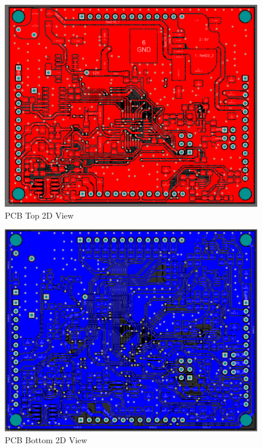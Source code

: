 		\begin{figure}[htbp]
			\centering
			\includegraphics[scale=0.7]{figuras/fig-pcb-design-top.png}
			\caption{PCB Top 2D View \cite{pcb-design-top}}
			\label{fig:pcb-design-top}
		\end{figure}

		\begin{figure}[htbp]
			\centering
			\includegraphics[scale=0.7]{figuras/fig-pcb-design-bottom.png}
			\caption{PCB Bottom 2D View \cite{pcb-design-bottom}}
			\label{fig:pcb-design-bottom}
		\end{figure}

